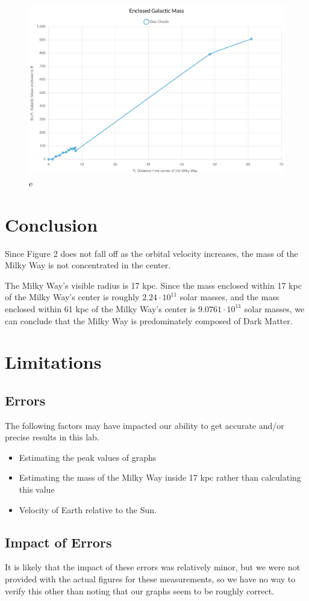 \documentclass{article}
\begin{document}
\begin{center}
\begin{figure}[h!bt]
        \centering
    \end{figure}
    \begin{figure}[h!bt]
        \caption{
            e
            \smallskip
        }
        \includegraphics[scale=0.1]{distance-enclosed-mass.jpg}
        \centering
    \end{figure}
\end{center}

\section{Conclusion}

Since Figure 2 does not fall off as the orbital velocity increases, the mass of the Milky Way is not concentrated in the center.

The Milky Way's visible radius is 17 kpc.
Since the mass enclosed within 17 kpc of the Milky Way's center is roughly $2.24 \cdot 10^{11}$ solar masses, and the mass enclosed within 61 kpc of the Milky Way's center is $9.0761 \cdot 10^{11}$ solar masses, we can conclude that the Milky Way is predominately composed of Dark Matter.

\section{Limitations}

\subsection{Errors}
The following factors may have impacted our ability to get accurate and/or
precise results in this lab.

\begin{itemize}
    \item Estimating the peak values of graphs 
    \item Estimating the mass of the Milky Way inside 17 kpc rather than calculating this value
    \item Velocity of Earth relative to the Sun.
\end{itemize}

\subsection{Impact of Errors}

It is likely that the impact of these errors was relatively minor, but we were not provided with the actual figures for these measurements, so we have no way to verify this other than noting that our graphs seem to be roughly correct.
\end{document}
